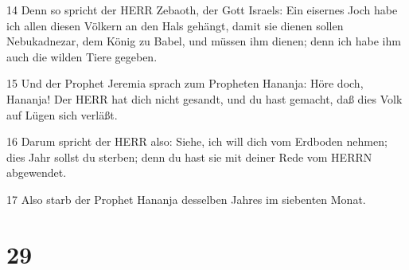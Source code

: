 \par 14 Denn so spricht der HERR Zebaoth, der Gott Israels: Ein eisernes Joch habe ich allen diesen Völkern an den Hals gehängt, damit sie dienen sollen Nebukadnezar, dem König zu Babel, und müssen ihm dienen; denn ich habe ihm auch die wilden Tiere gegeben.
\par 15 Und der Prophet Jeremia sprach zum Propheten Hananja: Höre doch, Hananja! Der HERR hat dich nicht gesandt, und du hast gemacht, daß dies Volk auf Lügen sich verläßt.
\par 16 Darum spricht der HERR also: Siehe, ich will dich vom Erdboden nehmen; dies Jahr sollst du sterben; denn du hast sie mit deiner Rede vom HERRN abgewendet.
\par 17 Also starb der Prophet Hananja desselben Jahres im siebenten Monat.

\chapter{29}

